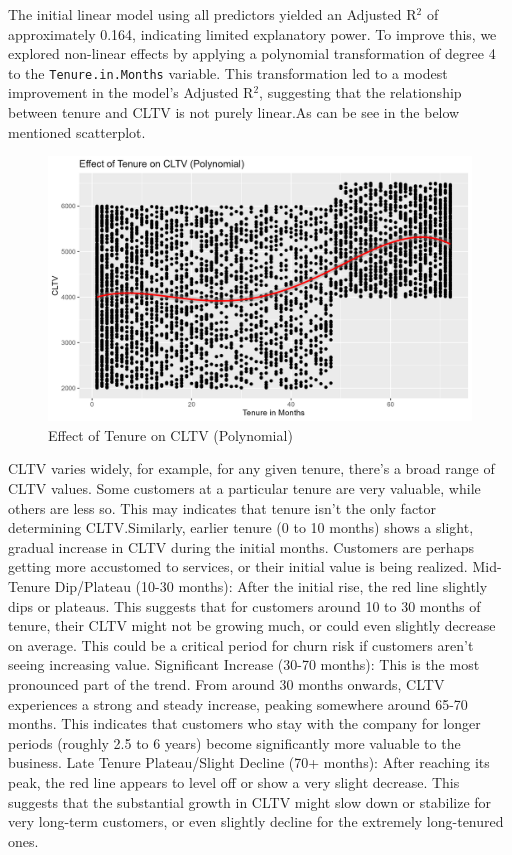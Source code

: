 \documentclass[
]{article}
\begin{document}
The initial linear model using all predictors yielded an Adjusted
R\(^2\) of approximately 0.164, indicating limited explanatory power. To
improve this, we explored non-linear effects by applying a polynomial
transformation of degree 4 to the \texttt{Tenure.in.Months} variable.
This transformation led to a modest improvement in the model's Adjusted
R\(^2\), suggesting that the relationship between tenure and CLTV is not
purely linear.As can be see in the below mentioned scatterplot.

\begin{figure}

{\centering \includegraphics[width=0.85\linewidth]{Plots/cltv_vs_tenure} 

}

\caption{Effect of Tenure on CLTV (Polynomial)}\label{fig:cltv-vs-tenure-img}
\end{figure}

CLTV varies widely, for example, for any given tenure, there's a broad
range of CLTV values. Some customers at a particular tenure are very
valuable, while others are less so. This may indicates that tenure isn't
the only factor determining CLTV.Similarly, earlier tenure (0 to 10
months) shows a slight, gradual increase in CLTV during the initial
months. Customers are perhaps getting more accustomed to services, or
their initial value is being realized. Mid-Tenure Dip/Plateau (10-30
months): After the initial rise, the red line slightly dips or plateaus.
This suggests that for customers around 10 to 30 months of tenure, their
CLTV might not be growing much, or could even slightly decrease on
average. This could be a critical period for churn risk if customers
aren't seeing increasing value. Significant Increase (30-70 months):
This is the most pronounced part of the trend. From around 30 months
onwards, CLTV experiences a strong and steady increase, peaking
somewhere around 65-70 months. This indicates that customers who stay
with the company for longer periods (roughly 2.5 to 6 years) become
significantly more valuable to the business. Late Tenure Plateau/Slight
Decline (70+ months): After reaching its peak, the red line appears to
level off or show a very slight decrease. This suggests that the
substantial growth in CLTV might slow down or stabilize for very
long-term customers, or even slightly decline for the extremely
long-tenured ones.
\end{document}

